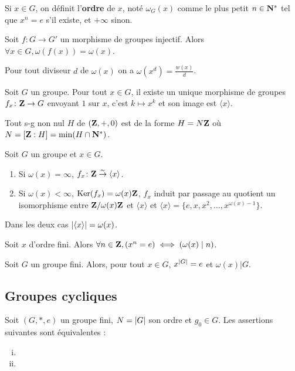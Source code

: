 	\begin{defn}
		Si  $x \in G$, on définit l'\textbf{ordre} de $x$, noté $\omega_G(x)$ comme le plus petit $n \in \mathbf{N}^*$ tel que $x^n = e$ s'il existe, et $+\infty$ sinon.
	\end{defn}

	\begin{lem}
		Soit $f \colon G \to G'$ un morphisme de groupes injectif.
		Alors $\forall x \in G, \omega(f(x)) = \omega(x)$.
	\end{lem}

	\begin{lem}
		Pour tout diviseur $d$ de $\omega(x)$ on a $\omega(x^d) = \frac{w(x)}{d}$.
	\end{lem}

	\begin{lem}
		Soit $G$ un groupe.
		Pour tout $x \in G$, il existe un unique morphisme de groupes $f_x \colon \mathbf{Z} \to G$ envoyant $1$ sur $x$, c'est $k \mapsto x^k$ et son image est $\langle x \rangle$.
	\end{lem}

	\begin{lem}
		Tout s-g non nul $H$ de $(\mathbf{Z},+,0)$ est de la forme $H = N\mathbf{Z}$ où $N = [\mathbf{Z} : H] = \min(H \cap \mathbf{N}^*)$.
	\end{lem}

	\begin{pop}
		Soit $G$ un groupe et $x \in G$.
		\begin{enumerate}
			\item Si $\omega(x) = \infty$, $f_x \colon \mathbf{Z} \overset{\sim}{\to} \langle x \rangle$.
			\item Si $\omega(x) < \infty$, $\operatorname{Ker}(f_x) = \omega(x) \mathbf{Z}$, $f_x$ induit par passage au quotient un isomorphisme entre $\mathbf{Z} / \omega(x)\mathbf{Z}$ et $\langle x \rangle$ et $\langle x \rangle = \{ e, x, x^2, \ldots, x^{\omega(x) - 1} \}$.
		\end{enumerate}
		Dans les deux cas $\left\lvert\langle x \rangle\right\rvert = \omega(x)$.
	\end{pop}

	\begin{cor}
		Soit $x$ d'ordre fini.
		Alors $\forall n \in \mathbf{Z}, \left( x^n = e \right) \iff \left( \omega(x) \mid n \right)$.
	\end{cor}

	\begin{thm}
		Soit $G$ un groupe fini.
		Alors, pour tout $x \in G$, $x^{\left\lvert G\right\rvert} = e$ et $\omega(x) \vert G$.
	\end{thm}


\subsection{Groupes cycliques}

	\begin{pop}
		Soit $(G,*,e)$ un groupe fini, $N = \left\lvert G\right\rvert$ son ordre et $g_0 \in G$.
		Les assertions suivantes sont équivalentes :
		\begin{enumerate}[(i)]
			\item 
			\item 
		\end{enumerate}
	\end{pop}
